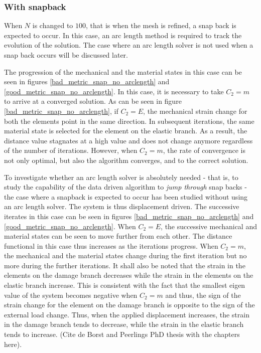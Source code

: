 \documentclass[11pt]{elsarticle}
\begin{document}
\subsubsection*{With snapback}

When $N$ is changed to $100$, that is when the mesh is refined, a snap back is expected to occur. In this case, an arc length method is required to track the evolution of the solution. The case where an arc length solver is not used when a snap back occurs will be discussed later. 

The progression of the mechanical and the material states in this case can be seen in figures \ref{bad_metric_snap_no_arclength} and \ref{good_metric_snap_no_arclength}. In this case, it is necessary to take $C_2=m$ to arrive at a converged solution. As can be seen in figure \ref{bad_metric_snap_no_arclength}, if $C_2=E$, the mechanical strain change for both the elements point in the same direction. In subsequent iterations, the same material state is selected for the element on the elastic branch. As a result, the distance value stagnates at a high value and does not change anymore regardless of the number of iterations. However, when $C_2=m$, the rate of convergence is not only optimal, but also the algorithm converges, and to the correct solution.

To investigate whether an arc length solver is absolutely needed - that is, to study the capability of the data driven algorithm to \textit{jump through} snap backs - the case where a snapback is expected to occur has been studied without using an arc length solver. The system is thus displacement driven. The successive iterates in this case can be seen in figures \ref{bad_metric_snap_no_arclength} and \ref{good_metric_snap_no_arclength}. When $C_2=E$, the successive mechanical and material states can be seen to move further from each other. The distance functional in this case thus increases as the iterations progress. When $C_2=m$, the mechanical and the material states change during the first iteration but no more during the further iterations. It shall also be noted that the strain in the elements on the damage branch decreases while the strain in the elements on the elastic branch increase. This is consistent with the fact that the smallest eigen value of the system becomes negative when $C_2=m$ and thus, the sign of the strain change for the element on the damage branch is opposite to the sign of the external load change. Thus, when the applied displacement increases, the strain in the damage branch tends to decrease, while the strain in the elastic branch tends to increase. (Cite de Borst and Peerlings PhD thesis with the chapters here). 
\end{document}
